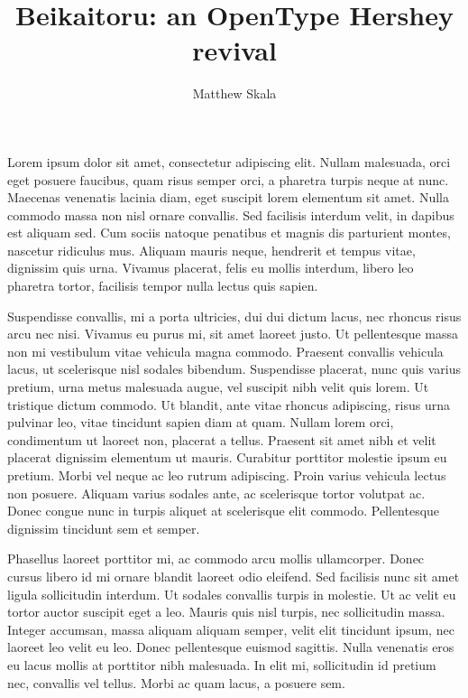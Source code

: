 \documentclass[10pt]{article}
\title{Beikaitoru: an OpenType Hershey revival}
\author{Matthew Skala}
\begin{document}
\maketitle

Lorem ipsum dolor sit amet, consectetur adipiscing elit. Nullam malesuada,
orci eget posuere faucibus, quam risus semper orci, a pharetra turpis neque
at nunc. Maecenas venenatis lacinia diam, eget suscipit lorem elementum sit
amet. Nulla commodo massa non nisl ornare convallis. Sed facilisis interdum
velit, in dapibus est aliquam sed. Cum sociis natoque penatibus et magnis
dis parturient montes, nascetur ridiculus mus. Aliquam mauris neque,
hendrerit et tempus vitae, dignissim quis urna. Vivamus placerat, felis eu
mollis interdum, libero leo pharetra tortor, facilisis tempor nulla lectus
quis sapien.

Suspendisse convallis, mi a porta ultricies, dui dui dictum lacus, nec
rhoncus risus arcu nec nisi. Vivamus eu purus mi, sit amet laoreet justo. Ut
pellentesque massa non mi vestibulum vitae vehicula magna commodo. Praesent
convallis vehicula lacus, ut scelerisque nisl sodales bibendum. Suspendisse
placerat, nunc quis varius pretium, urna metus malesuada augue, vel suscipit
nibh velit quis lorem. Ut tristique dictum commodo. Ut blandit, ante vitae
rhoncus adipiscing, risus urna pulvinar leo, vitae tincidunt sapien diam at
quam. Nullam lorem orci, condimentum ut laoreet non, placerat a tellus.
Praesent sit amet nibh et velit placerat dignissim elementum ut mauris.
Curabitur porttitor molestie ipsum eu pretium. Morbi vel neque ac leo rutrum
adipiscing. Proin varius vehicula lectus non posuere. Aliquam varius sodales
ante, ac scelerisque tortor volutpat ac. Donec congue nunc in turpis aliquet
at scelerisque elit commodo. Pellentesque dignissim tincidunt sem et semper.

Phasellus laoreet porttitor mi, ac commodo arcu mollis ullamcorper. Donec
cursus libero id mi ornare blandit laoreet odio eleifend. Sed facilisis nunc
sit amet ligula sollicitudin interdum. Ut sodales convallis turpis in
molestie. Ut ac velit eu tortor auctor suscipit eget a leo. Mauris quis nisl
turpis, nec sollicitudin massa. Integer accumsan, massa aliquam aliquam
semper, velit elit tincidunt ipsum, nec laoreet leo velit eu leo. Donec
pellentesque euismod sagittis. Nulla venenatis eros eu lacus mollis at
porttitor nibh malesuada. In elit mi, sollicitudin id pretium nec, convallis
vel tellus. Morbi ac quam lacus, a posuere sem.
\end{document}
